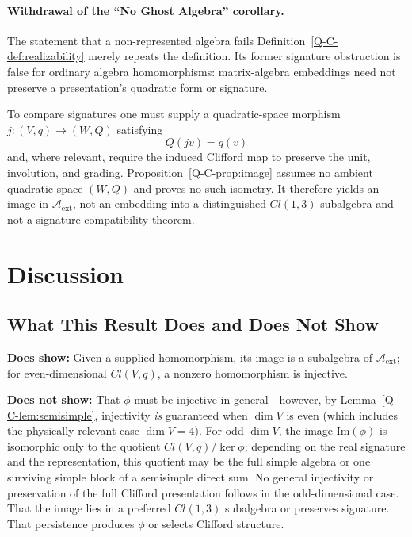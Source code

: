 \documentclass[12pt,a4paper,openany]{book}
\begin{document}
\paragraph{Withdrawal of the ``No Ghost Algebra'' corollary.}
The statement that a non-represented algebra fails Definition~\ref{Q-C-def:realizability} merely repeats the definition.  Its former signature obstruction is false for ordinary algebra homomorphisms: matrix-algebra embeddings need not preserve a presentation's quadratic form or signature.

To compare signatures one must supply a quadratic-space morphism $j:(V,q)\to(W,Q)$ satisfying
\begin{equation}
Q(jv)=q(v)
\end{equation}
and, where relevant, require the induced Clifford map to preserve the unit, involution, and grading.  Proposition~\ref{Q-C-prop:image} assumes no ambient quadratic space $(W,Q)$ and proves no such isometry.  It therefore yields an image in $\mathcal A_{\mathrm{ext}}$, not an embedding into a distinguished $Cl(1,3)$ subalgebra and not a signature-compatibility theorem.

\section{Discussion}
\label{Q-C-sec:discussion}

\subsection{What This Result Does and Does Not Show}

\textbf{Does show:}
Given a supplied homomorphism, its image is a subalgebra of $\mathcal A_{\mathrm{ext}}$; for even-dimensional $Cl(V,q)$, a nonzero homomorphism is injective.

\textbf{Does not show:}
That $\phi$ must be injective in general---however,
by Lemma~\ref{Q-C-lem:semisimple}, injectivity \emph{is}
guaranteed when $\dim V$ is even
(which includes the physically relevant case $\dim V = 4$).
For odd $\dim V$, the image $\mathrm{Im}(\phi)$ is
isomorphic only to the quotient $Cl(V,q)/\ker\phi$; depending on the
real signature and the representation, this quotient may be the full
simple algebra or one surviving simple block of a semisimple direct sum.
No general injectivity or preservation of the full Clifford presentation
follows in the odd-dimensional case.
That the image lies in a preferred $Cl(1,3)$ subalgebra or preserves signature.
That persistence produces $\phi$ or selects Clifford structure.
\end{document}
